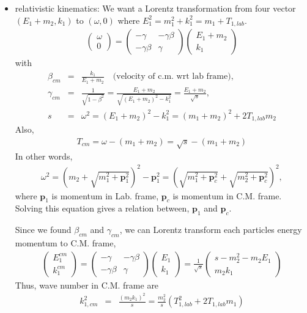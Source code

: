 \documentclass[10pt]{book}
\def\bm{\boldsymbol}
\newcommand{\bea}{\begin{eqnarray}}
\newcommand{\eea}{\end{eqnarray}}
\newcommand{\no}{\nonumber \\}
\def\vp{{\bm p}}
\begin{document}
\begin{itemize}
\item relativistic kinematics:
We want a Lorentz transformation from four vector $(E_1+m_2,k_1)$ to $(\omega,0)$
where $E_1^2=m_1^2+k_1^2=m_1+T_{1,lab}$.
\bea 
\left( \begin{array}{c} \omega \\ 0\end{array} \right)= 
\left( \begin{array}{cc} -\gamma & -\gamma\beta \\ -\gamma\beta & \gamma \end{array} \right)
\left( \begin{array}{c} E_1+m_2 \\ k_1\end{array} \right)
\eea 
with 
\bea 
\beta_{cm}&=& \frac{k_1}{E_1+m_2}\quad \mbox{(velocity of c.m. wrt lab frame)},\no 
\gamma_{cm}&=&\frac{1}{\sqrt{1-\beta^2}}=\frac{E_1+m_2}{\sqrt{(E_1+m_2)^2-k_1^2}}
              =\frac{E_1+m_2}{\sqrt{s}},\no 
s&=&\omega^2=(E_1+m_2)^2-k_1^2
            =(m_1+m_2)^2+2 T_{1,lab} m_2               
\eea   
Also,
\bea 
T_{cm}=\omega-(m_1+m_2)=\sqrt{s}-(m_1+m_2)
\eea 
In other words, 
\bea
\omega^2=(m_2+\sqrt{m_1^2+\vp_1^2})^2-\vp_1^2 
       =(\sqrt{m_1^2+\vp_c^2}+\sqrt{m_2^2+\vp_c^2})^2,
\eea
where $\vp_{1}$ is momentum in Lab. frame, $\vp_c$ is momentum in
C.M. frame. Solving this equation gives a relation between,
$\vp_1$ and $\vp_c$. 

Since we found $\beta_{cm}$ and $\gamma_{cm}$, we can Lorentz transform each particles
energy momentum to C.M. frame,
\bea 
\left( \begin{array}{c} E_1^{cm} \\ k_1^{cm}\end{array} \right)= 
\left( \begin{array}{cc} -\gamma & -\gamma\beta \\ -\gamma\beta & \gamma \end{array} \right)
\left( \begin{array}{c} E_1 \\ k_1\end{array} \right)
 =\frac{1}{\sqrt{s}} \left( \begin{array}{c} s-m_2^2-m_2 E_1 \\ m_2 k_1\end{array} \right)
\eea 
Thus, wave number in C.M. frame are 
\bea 
k_{1,cm}^2 &=& \frac{(m_2 k_1)^2}{s}=\frac{m_2^2}{s}(T_{1,lab}^2+2 T_{1,lab} m_1)
\eea 
\end{itemize}
\end{document}
